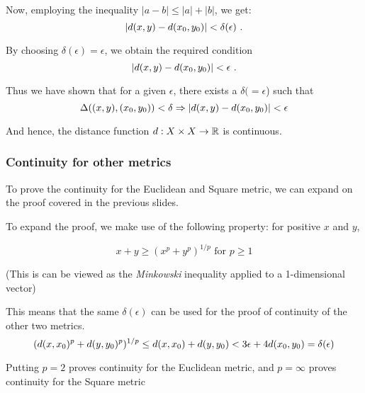 \begin{frame}
    Now, employing the inequality \(|a-b|\leq |a|+|b|\), we get:
    \begin{equation*}
        |d(x, y) - d(x_0, y_0)| < \delta(\epsilon)~.
    \end{equation*}

    By choosing \(\delta(\epsilon) = \epsilon\), we obtain the required condition 
    \begin{equation*}
        |d(x, y) - d(x_0, y_0)| < \epsilon~.
    \end{equation*}

    Thus we have shown that for a given \(\epsilon\), there exists a \(\delta (= \epsilon\)) such that 
    \begin{equation*}
        \Delta((x, y), (x_0, y_0)) < \delta \Rightarrow |d(x, y) - d(x_0, y_0)| < \epsilon
    \end{equation*}

    And hence, the distance function \(d:X\times X \rightarrow \mathbb{R} \) is continuous.

\end{frame}


\begin{frame}
    \frametitle{Continuity for other metrics}

    To prove the continuity for the Euclidean and Square metric, we can expand on the proof covered in the previous slides.

    \pause
    To expand the proof, we make use of the following property:
    for positive \(x\) and \(y\),
     
    \begin{equation}
        x+y \geq (x^p+y^p)^{1/p} \text{ for } p \geq 1
    \end{equation}

    (This is can be viewed as the \textit{Minkowski} inequality applied to a 1-dimensional vector)

    \pause

    This means that the same \(\delta(\epsilon)\) can be used for the proof of continuity of the other two metrics.
    \begin{equation}
        (d(x, x_0)^p + d(y, y_0)^p)^{1/p} \leq d(x, x_0) + d(y, y_0) < 3\epsilon + 4d(x_0, y_0) = \delta(\epsilon)
    \end{equation}

    Putting \(p = 2\) proves continuity for the Euclidean metric, and \(p=\infty\) proves continuity for the Square metric
    
\end{frame}

